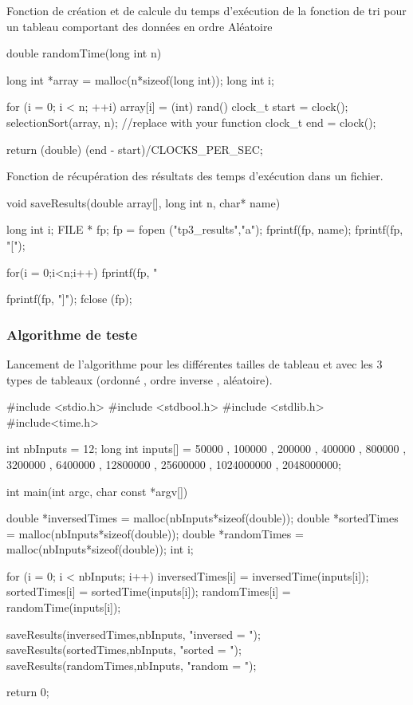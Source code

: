 \documentclass[12pt]{article}
\begin{document}
Fonction de création et de calcule du temps d'exécution de la fonction de tri pour un tableau comportant des données en ordre Aléatoire
\begin{sql}
double randomTime(long int n) {
    
  long int *array = malloc(n*sizeof(long int));
  long int i;
  
  for (i = 0; i < n; ++i)
  {
    array[i] = (int) rand()%
  }
  clock_t start = clock();
  selectionSort(array, n); //replace with your function 
  clock_t end = clock();

  return (double) (end - start)/CLOCKS_PER_SEC;
}
\end{sql}

Fonction de récupération des résultats des temps d'exécution dans un fichier.
\begin{sql}
  void saveResults(double array[], long int n, char* name) {

     long int i;
     FILE * fp;
     fp = fopen ("tp3_results","a");
     fprintf(fp, name);
     fprintf(fp, "[");

     for(i = 0;i<n;i++) {
      fprintf(fp, "%
     }

     fprintf(fp, "]\n");
     fclose (fp);
  }
\end{sql}

\subsubsection{Algorithme de teste }
Lancement de l'algorithme pour les différentes tailles de tableau et avec les 3 types de tableaux (ordonné , ordre inverse , aléatoire).

\begin{sql}
#include <stdio.h>
#include <stdbool.h>
#include <stdlib.h>
#include<time.h>

int nbInputs = 12;
long int inputs[] = {50000 , 100000 , 200000 , 400000 , 800000 , 3200000 , 6400000 , 12800000 , 25600000 , 1024000000 , 2048000000};
         
int main(int argc, char const *argv[])
  {
  double *inversedTimes = malloc(nbInputs*sizeof(double));
  double *sortedTimes = malloc(nbInputs*sizeof(double));
  double *randomTimes = malloc(nbInputs*sizeof(double));
  int i;

  for (i = 0; i < nbInputs; i++)
  {
    inversedTimes[i] = inversedTime(inputs[i]);
    sortedTimes[i] = sortedTime(inputs[i]);
    randomTimes[i] = randomTime(inputs[i]);
  }

  saveResults(inversedTimes,nbInputs, "inversed = ");
  saveResults(sortedTimes,nbInputs, "sorted = ");
  saveResults(randomTimes,nbInputs, "random = ");

  return 0;
  }
\end{sql}
\end{document}
